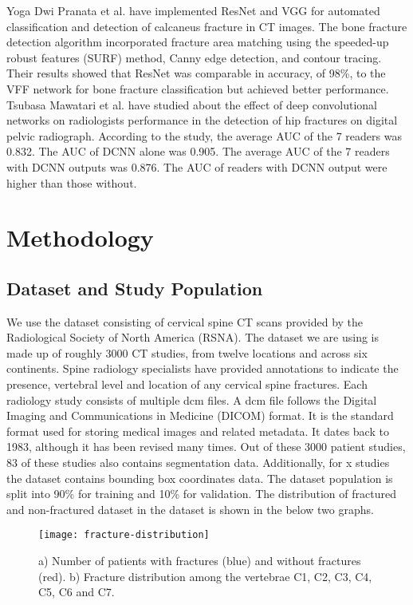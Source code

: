 \documentclass[pdflatex,sn-mathphys]{sn-jnl}%
\theoremstyle{thmstyleone}%
\theoremstyle{thmstyletwo}%
\theoremstyle{thmstylethree}%
\begin{document}
Yoga Dwi Pranata et al. have implemented ResNet and VGG for automated classification and detection of calcaneus fracture in CT images\cite{PRANATA201927}. The bone fracture detection algorithm incorporated fracture area matching using the speeded-up robust features (SURF) method, Canny edge detection, and contour tracing. Their results showed that ResNet was comparable in accuracy, of 98\%, to the VFF network for bone fracture classification but achieved better performance. Tsubasa Mawatari et al. have studied about the effect of deep convolutional networks on radiologists performance in the detection of hip fractures on digital pelvic radiograph. According to the study, the average AUC of the 7 readers was 0.832. The AUC of DCNN alone was 0.905. The average AUC of the 7 readers with DCNN outputs was 0.876. The AUC of readers with DCNN output were higher than those without\cite{Mawatari:2020aa}.

\section{Methodology}\label{sec2}

\subsection{Dataset and Study Population}\label{subsec2}

We use the dataset consisting of cervical spine CT scans provided by the Radiological Society of North America (RSNA)\cite{rsna-url}. The dataset we are using is made up of roughly 3000 CT studies, from twelve locations and across six continents. Spine radiology specialists have provided annotations to indicate the presence, vertebral level and location of any cervical spine fractures. Each radiology study consists of multiple dcm files. A dcm file follows the Digital Imaging and Communications in Medicine (DICOM) format. It is the standard format used for storing medical images and related metadata. It dates back to 1983, although it has been revised many times. Out of these 3000 patient studies, 83 of these studies also contains segmentation data. Additionally, for x studies the dataset contains bounding box coordinates data. The dataset population is split into 90\% for training and 10\% for validation. The distribution of fractured and non-fractured dataset in the dataset is shown in the below two graphs.

\begin{figure}[H]
\centering
 \begin{minipage}[c]{1\textwidth}
    \texttt{[image: fracture-distribution]}
    \caption{\centering\footnotesize{a) Number of patients with fractures (blue) and without fractures (red). b) Fracture distribution among the vertebrae C1, C2, C3, C4, C5, C6 and C7. }}
    \label{fig:mesh1}
\end{minipage}
\end{figure}
\end{document}

